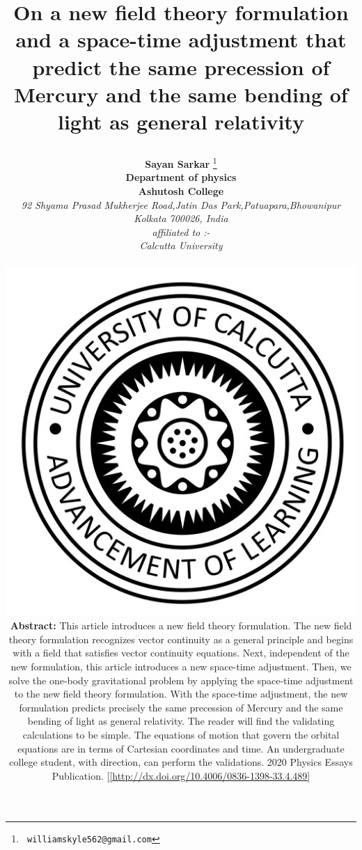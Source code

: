 \documentclass[12pt]{article}
\begin{document}
\begin{titlepage}
    \title{
        {\huge\bf\color{blue}On a new field theory formulation and a space-time adjustment that
        predict the same precession of Mercury and the same bending of light
        as general relativity}\\
        \author{{\bf Sayan Sarkar} \footnote{{\tt\color{red} williamskyle562@gmail.com}}\hspace{8pt} 
        \hfill\\
        \centering
        {\large\bf{Department of physics}}\\ \bigskip
        {\Large\bf{Ashutosh College}}\\ \bigskip
        {\it\large 92 Shyama Prasad Mukherjee Road,Jatin Das Park,Patuapara,Bhowanipur}\\
        {\it\small Kolkata 700026, India} \bigskip
        \hfill\\        
        \centering      
        {\it\large affiliated to :- \\ Calcutta University }
        \hfill\\
        \centering
        \begin{figure}[htbp]
            \includegraphics[width=0.4\linewidth, center]{calc.png}
        \end{figure}
        \newpage
        \textbf{Abstract:}
         This article introduces a new field theory formulation. The new field theory formulation
        recognizes vector continuity as a general principle and begins with a field that satisfies vector
        continuity equations. Next, independent of the new formulation, this article introduces a
        new space-time adjustment. Then, we solve the one-body gravitational problem by applying the
        space-time adjustment to the new field theory formulation. With the space-time adjustment,
        the new formulation predicts precisely the same precession of Mercury and the same bending
        of light as general relativity. The reader will find the validating calculations to be simple.
        The equations of motion that govern the orbital equations are in terms of Cartesian coordinates
        and time. An undergraduate college student, with direction, can perform the validations.
         2020 Physics Essays Publication. 
        [\url{[http://dx.doi.org/10.4006/0836-1398-33.4.489]}
        }     
        }
\end{titlepage}
\maketitle\vfill \eject
\tableofcontents
\end{document}
